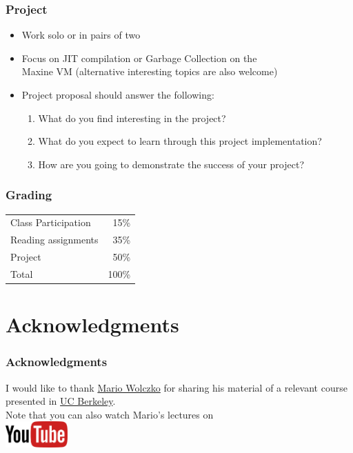 \documentclass[
14pt,
aspectratio=169,
usenames,
dvipsnames,
x11names]{beamer}
\begin{document}
\begin{frame}
  \frametitle{Project}
  \begin{itemize}[<+->] \setlength{\itemsep}{\fill}
  \item Work \alert{solo} or in \alert{pairs of two}
  \item Focus on \alert{JIT compilation} or \alert{Garbage Collection} on the\\
    \alert{Maxine VM}
    (alternative interesting topics are also welcome)
  \item Project proposal should \alert{answer the following}:
    \begin{enumerate}
    \item What do you find interesting in the project?
    \item What do you expect to learn through this project implementation?
    \item How are you going to demonstrate the success of your project?
    \end{enumerate}
  \end{itemize}
\end{frame}

\begin{frame}
  \frametitle{Grading}
  \centering
  \begin{tabular}{l r}
     Class Participation & 15\%               \\
     Reading assignments & 35\%               \\
     Project             & 50\%   \\
    \hline Total                     & 100\%              \\
  \end{tabular}
\end{frame}

\section{Acknowledgments}

\begin{frame}
  \frametitle{Acknowledgments}
  \centering
  \large
  I would like to thank \href{http://www.wolczko.com/CS294}{\alert{Mario Wolczko}} for sharing his material of a relevant course presented in \href{http://www.wolczko.com/CS294/}{\alert{UC Berkeley}}.\\[1em]

  Note that you can also watch Mario's lectures on\\[1em]
  \href{https://www.youtube.com/channel/UCKvk5mv6aIDS9zNh-vI1s5Q/videos}{\includegraphics[height=1cm]{youtube}}
\end{frame}
\end{document}
